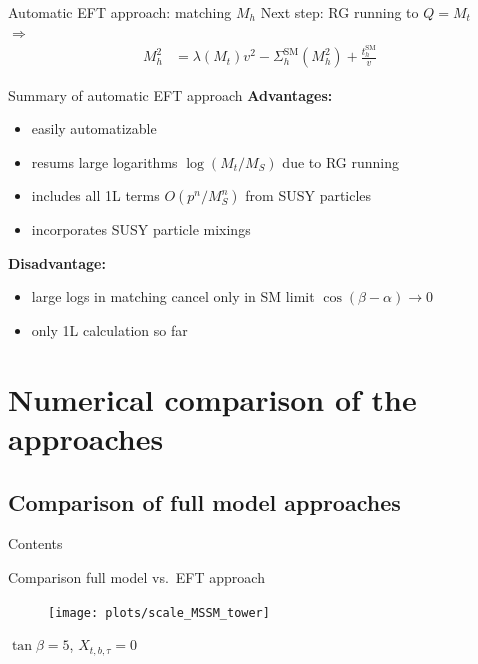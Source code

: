 \documentclass[hyperref={pdfpagelabels=false},ngerman]{beamer}
\renewcommand{\emph}{\textbf}
\newcommand{\SM}{\ensuremath{\text{SM}}}
\begin{document}
\begin{frame}{Automatic EFT approach: matching $M_h$}
  Next step: RG running to $Q = M_t$\\
  $\Rightarrow$
  \begin{align*}
    M_h^2 &= \lambda(M_t) v^2 - \Sigma^{\SM}_h(M_h^2) + \frac{t_h^\SM}{v}
  \end{align*}
\end{frame}


\begin{frame}{Summary of automatic EFT approach}
  \emph{Advantages:}
  \begin{itemize}
  \item easily automatizable
  \item resums large logarithms $\log(M_t/M_S)$ due to RG running
  \item includes all 1L terms $O(p^n/M_S^n)$ from SUSY particles
  \item incorporates SUSY particle mixings
  \end{itemize}
  \emph{Disadvantage:}
  \begin{itemize}
  \item large logs in matching cancel only in SM limit $\cos(\beta - \alpha) \rightarrow 0$
  \item only 1L calculation so far
  \end{itemize}
\end{frame}


\section{Numerical comparison of the approaches}
\subsection{Comparison of full model approaches}

\begin{frame}{Contents}
  \tableofcontents[currentsection]  
\end{frame}

\begin{frame}{Comparison full model vs.\ EFT approach}
  \begin{figure}
    \centering
    \texttt{[image: plots/scale\_MSSM\_tower]}
  \end{figure}
  $\tan\beta = 5$, $X_{t,b,\tau} = 0$
\end{frame}
\end{document}

